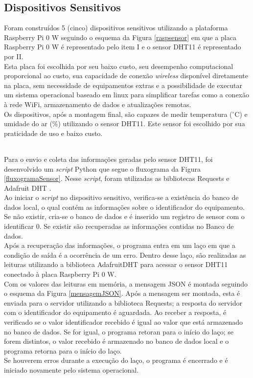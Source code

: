 \subsection{Dispositivos Sensitivos}
\quad Foram construídos 5 (cinco) dispositivos sensitivos utilizando a plataforma Raspberry Pi 0 W seguindo o esquema da Figura \ref{raspsensor} em que a placa Raspberry Pi 0 W é representado pelo item I e o sensor DHT11 é representado por II.
\\\null \quad Esta placa foi escolhida por seu baixo custo, seu desempenho computacional proporcional ao custo, sua capacidade de conexão \textit{wireless} disponível diretamente na placa, sem necessidade de equipamentos extras e a possibilidade de executar um sistema operacional baseado em linux para simplificar tarefas como a conexão à rede WiFi, armazenamento de dados e atualizações remotas.
\\\null \quad Os dispositivos, após a montagem final, são capazes de medir temperatura ($^\circ$C) e umidade do ar (\%) utilizando o sensor DHT11. Este sensor foi escolhido
por sua praticidade de uso e baixo custo.

\\\null \quad Para o envio e coleta das informações geradas pelo sensor DHT11, foi desenvolvido um \textit{script} Python que segue o fluxograma da Figura \ref{fluxogramaSensor}. Nesse \textit{script}, foram utilizadas as bibliotecas Requests \cite{Requests} e Adafruit DHT \cite{AdafruitDHT}.
\\\null \quad Ao iniciar o \textit{script} no dispositivo sensitivo, verifica-se a existência do banco de dados local, o qual contém as informações sobre o identificador do equipamento. Se não existir, cria-se o banco de dados e é inserido um registro de sensor com o identificar 0. Se existir são recuperadas as informações contidas no Banco de dados.
\\\null \quad Após a recuperação das informações, o programa entra em um laço em que a condição de saída é a ocorrência de um erro. Dentro desse laço, são realizadas as leituras utilizando a biblioteca AdafruitDHT para acessar o sensor DHT11 conectado à placa Raspberry Pi 0 W.
\\\null \quad Com os valores das leituras em memória, a mensagem JSON é montada seguindo o esquema da Figura \ref{mensagemJSON}. Após a mensagem ser montada, esta é enviada para o servidor utilizando a biblioteca Requests; a resposta do servidor com o identificador do equipamento é aguardada. Ao receber a resposta, é verificado se o valor identificador recebido é igual ao valor que está armazenado no banco de dados. Se for igual, o programa retoran para o início do laço; se forem distintos, o valor recebido é armazenado no banco de dados local e o programa retorna para o início do laço.
\\\null \quad Se houverem erros durante a execução do laço, o programa é encerrado e é iniciado novamente pelo sistema operacional.



